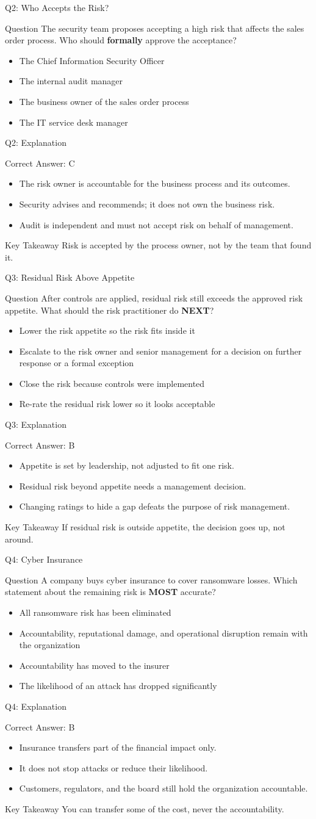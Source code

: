 \documentclass[aspectratio=169]{beamer}
\newcommand{\hq}[7]{%
	\begin{frame}{Q#1: #2}
		\begin{block}{Question}
			#3
		\end{block}
		\begin{itemize}
			#4
		\end{itemize}
	\end{frame}
	\begin{frame}{Q#1: Explanation}
		\begin{block}{Correct Answer: #5}
			\begin{itemize}
				#6
			\end{itemize}
		\end{block}
		\begin{alertblock}{Key Takeaway}
			#7
		\end{alertblock}
	\end{frame}
}
\begin{document}
	\hq{2}{Who Accepts the Risk?}
	{The security team proposes accepting a high risk that affects the sales order process. Who should \textbf{formally} approve the acceptance?}
	{\item[\textbf{(A)}] The Chief Information Security Officer
		\item[\textbf{(B)}] The internal audit manager
		\item[\textbf{(C)}] The business owner of the sales order process
		\item[\textbf{(D)}] The IT service desk manager}
	{C}
	{\item The risk owner is accountable for the business process and its outcomes.
		\item Security advises and recommends; it does not own the business risk.
		\item Audit is independent and must not accept risk on behalf of management.}
	{Risk is accepted by the process owner, not by the team that found it.}
	
	\hq{3}{Residual Risk Above Appetite}
	{After controls are applied, residual risk still exceeds the approved risk appetite. What should the risk practitioner do \textbf{NEXT}?}
	{\item[\textbf{(A)}] Lower the risk appetite so the risk fits inside it
		\item[\textbf{(B)}] Escalate to the risk owner and senior management for a decision on further response or a formal exception
		\item[\textbf{(C)}] Close the risk because controls were implemented
		\item[\textbf{(D)}] Re-rate the residual risk lower so it looks acceptable}
	{B}
	{\item Appetite is set by leadership, not adjusted to fit one risk.
		\item Residual risk beyond appetite needs a management decision.
		\item Changing ratings to hide a gap defeats the purpose of risk management.}
	{If residual risk is outside appetite, the decision goes up, not around.}
	
	\hq{4}{Cyber Insurance}
	{A company buys cyber insurance to cover ransomware losses. Which statement about the remaining risk is \textbf{MOST} accurate?}
	{\item[\textbf{(A)}] All ransomware risk has been eliminated
		\item[\textbf{(B)}] Accountability, reputational damage, and operational disruption remain with the organization
		\item[\textbf{(C)}] Accountability has moved to the insurer
		\item[\textbf{(D)}] The likelihood of an attack has dropped significantly}
	{B}
	{\item Insurance transfers part of the financial impact only.
		\item It does not stop attacks or reduce their likelihood.
		\item Customers, regulators, and the board still hold the organization accountable.}
	{You can transfer some of the cost, never the accountability.}
	
\end{document}
